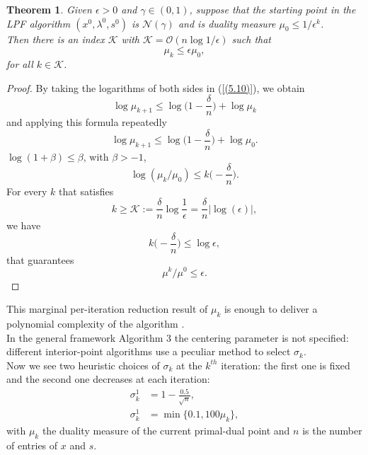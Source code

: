 \documentclass[a4paper,10 pt,titlepage,twoside]{book}
\theoremstyle{plain}
\newtheorem{thm}{Theorem}[chapter]
\theoremstyle{definition}
\theoremstyle{remark}
\begin{document}
\begin{thm}
	Given $\epsilon>0$ and $\gamma\in(0,1)$, suppose that the starting point in the LPF algorithm $(x^{0},\lambda^{0},s^{0})$ is $\mathcal{N}(\gamma)$ and is duality measure $\mu_{0}\leq1/\epsilon^{k}$.\\ Then there is an index $\mathcal{K}$ with $\mathcal{K}=\mathcal{O}(n\log1/\epsilon)$ such that 
	\begin{equation*}\mu_{k}\leq\epsilon\mu_{0},\end{equation*} for all $k\in\mathcal{K}$.
\end{thm}
\begin{proof}
	By taking the logarithms of both sides in (\ref{(5.10)}), we obtain
	\begin{equation*}
	\log\mu_{k+1}\leq \log \bigg(1-\frac{\delta}{n}\bigg)+\log\mu_{k}\end{equation*}
	and applying this formula repeatedly
	\begin{equation*}
	\log\mu_{k+1}\leq \log \bigg(1-\frac{\delta}{n}\bigg)+\log\mu_{0}.
	\end{equation*}
	 $\log(1+\beta)\leq\beta$, with $\beta>-1$,\\
	\begin{equation*}
	\log(\mu_{k}/\mu_{0})\leq k\bigg(-\frac{\delta}{n}\bigg).
	\end{equation*}	
	For every $k$ that satisfies
	\begin{equation*}
	k\geq\mathcal{K}:= \frac{\delta}{n}\log\frac{1}{\epsilon} = \frac{\delta}{n}|\log(\epsilon)|,
	\end{equation*}
	we have 
	\begin{equation*}
	k\bigg(-\frac{\delta}{n}\bigg)\leq\log\epsilon,
	\end{equation*}	
	that guarantees
	\begin{equation*}
	\mu^{k}/\mu^{0}\leq\epsilon.
	\end{equation*}	
\end{proof}

This marginal per-iteration reduction result of $\mu_{k}$ is enough to deliver a polynomial complexity of the algorithm \cite{25y}.\\

In the general framework Algorithm 3 the centering parameter is not specified: different interior-point algorithms use a peculiar method to select $\sigma_{k}$.\\
Now we see two heuristic choices of $\sigma_{k}$ at the $k^{th}$ iteration: the first one is fixed and the second one decreases at each iteration: 
\begin{align}
\sigma^{1}_{k} &= 1 -\frac{0.5}{\sqrt{n}},\label{LPF1}\tag{4.14a}\\
\sigma^{1}_{k} &= \min\{0.1, 100\mu_{k} \},\label{LPF2}\tag{4.14b}
\end{align}
with $\mu_{k}$ the duality measure of the current primal-dual point and $n$ is the number of entries of $x$ and $s$. 
\end{document}
